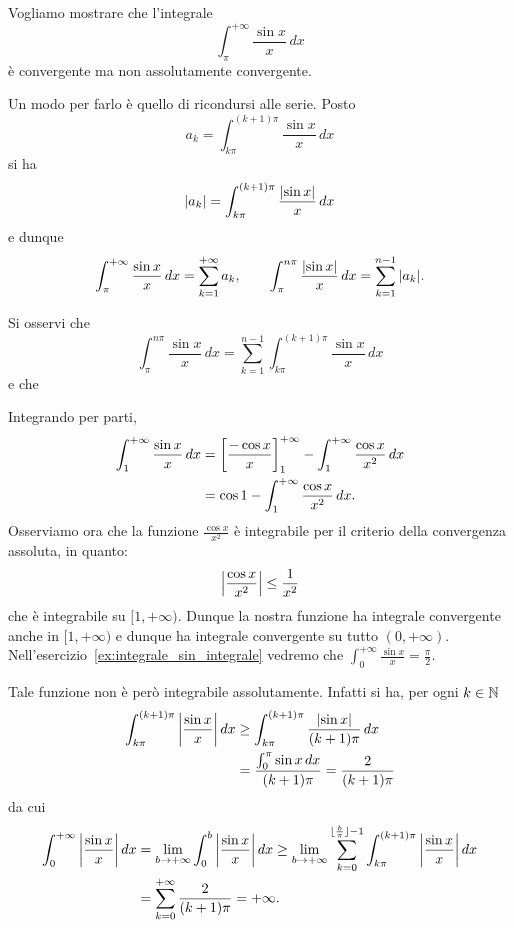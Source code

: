 \begin{example}
\label{ex:48864}%
\mymark{*}%
Vogliamo mostrare che l'integrale
\[
  \int_\pi^{+\infty} \frac{\sin x}{x}\, dx  
\]
è convergente ma non assolutamente convergente.

Un modo per farlo è quello di ricondursi alle serie.
Posto 
\[
  a_k = \int_{k\pi}^{(k+1)\pi} \frac{\sin x}{x}\, dx
\]
si ha
\[
  {\left|a_k\right|} = \int_{k\pi}^{(k+1)\pi} \frac{{\left|\sin x\right|}}{x}\, dx
\]
e dunque 
\[
\int_\pi^{+\infty} \frac{\sin x}{x}\, dx
= \sum_{k=1}^{+\infty} a_k, \qquad
\int_\pi^{n\pi} \frac{{\left|\sin x\right|}}{x}\, dx
= \sum_{k=1}^{n-1} {\left|a_k\right|}.
\]



Si osservi che 
\[
   \int_\pi^{n\pi} \frac{\sin x}{x}\, dx
   = \sum_{k=1}^{n-1} \int_{k\pi}^{(k+1)\pi} \frac{\sin x}{x}\, dx
\]
e che 



Integrando per parti,
\begin{align*}
  \int_1^{+\infty} \frac{\sin x}{x}\, dx
  &= {\left[ \frac{-\cos x}{x} \right]}_1^{+\infty} -
  \int_1^{+\infty} \frac{\cos x}{x^2} \, dx \\
  &= \cos 1 - \int_1^{+\infty} \frac{\cos x}{x^2}\, dx.
\end{align*}
Osserviamo ora che la funzione $\frac{\cos x}{x^2}$ è integrabile
per il criterio della convergenza assoluta, in quanto:
\[
  {\left|\frac{\cos x}{x^2}\right|} \le \frac{1}{x^2}
\]
che è integrabile su $[1,+\infty)$.
Dunque la nostra funzione ha integrale convergente anche in $[1,+\infty)$
e dunque ha integrale convergente su tutto $(0,+\infty)$.
Nell'esercizio~\ref{ex:integrale_sin_integrale} vedremo che
$\int_0^{+\infty} \frac{\sin x}{x} = \frac \pi 2$.

Tale funzione non è però integrabile assolutamente.
Infatti si ha,
per ogni $k\in {\mathbb N}$
\begin{align*}
  \int_{k\pi}^{(k+1)\pi} {\left|\frac{\sin x} x\right|}\, dx
  &\ge \int_{k\pi}^{(k+1)\pi} \frac{{\left|\sin x\right|}}{(k+1)\pi}\, dx\\
  &= \frac{\int_0^\pi \sin x \, dx}{(k+1)\pi}
  = \frac{2}{(k+1)\pi}
\end{align*}
da cui
\begin{align*}
  \int_0^{+\infty} {\left|\frac{\sin x}{x}\right|}\, dx
  & = \lim_{b\to +\infty} \int_0^b {\left|\frac{\sin x}{x}\right|}\, dx 
  \ge \lim_{b\to+\infty} \sum_{k=0}^{\lfloor \frac{b}{\pi}\rfloor-1} \int_{k\pi}^{(k+1)\pi}{\left|\frac{\sin x} x\right|}\, dx\\
  &= \sum_{k=0}^{+\infty} \frac{2}{(k+1)\pi} = +\infty.
\end{align*}
\end{example}

